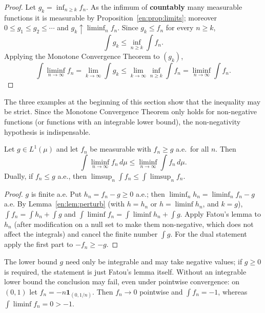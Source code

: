 \documentclass[11pt]{article}
\makeatletter
\newcommand{\envlabel}[1]{\protected@edef\@currentlabel{\themathenv}\label{#1}}
\makeatother
\begin{document}
\begin{proof}
Let $g_{k}=\inf_{n\geq k}f_{n}$. As the infimum of \textbf{countably} many measurable functions it is measurable by Proposition~\ref{en:prop:limits}; moreover $0\leq g_{1}\leq g_{2}\leq\cdots$ and $g_{k}\uparrow\liminf_{n}f_{n}$. Since $g_{k}\leq f_{n}$ for every $n\geq k$,
\[
\int g_{k}\leq\inf_{n\geq k}\int f_{n}.
\]
Applying the Monotone Convergence Theorem to $(g_{k})$,
\[
\int\liminf_{n\to\infty}f_{n}=\lim_{k\to\infty}\int g_{k}\leq\lim_{k\to\infty}\inf_{n\geq k}\int f_{n}=\liminf_{n\to\infty}\int f_{n}.
\]
\end{proof}

The three examples at the beginning of this section show that the inequality may be strict. Since the Monotone Convergence Theorem only holds for non-negative functions (or functions with an integrable lower bound), the non-negativity hypothesis is indispensable.

\begin{corollary}\envlabel{en:cor:fatougen}
Let $g\in L^{1}(\mu)$ and let $f_{n}$ be measurable with $f_{n}\geq g$ a.e.\ for all $n$. Then
\[
\int\liminf_{n\to\infty}f_{n}\,d\mu\leq\liminf_{n\to\infty}\int f_{n}\,d\mu.
\]
Dually, if $f_{n}\leq g$ a.e., then $\limsup_{n}\int f_{n}\leq\int\limsup_{n}f_{n}$.
\end{corollary}

\begin{proof}
$g$ is finite a.e. Put $h_{n}=f_{n}-g\geq0$ a.e.; then $\liminf_{n}h_{n}=\liminf_{n}f_{n}-g$ a.e. By Lemma~\ref{en:lem:perturb} (with $h=h_{n}$ or $h=\liminf h_{n}$, and $k=g$), $\int f_{n}=\int h_{n}+\int g$ and $\int\liminf f_{n}=\int\liminf h_{n}+\int g$. Apply Fatou's lemma to $h_{n}$ (after modification on a null set to make them non-negative, which does not affect the integrals) and cancel the finite number $\int g$. For the dual statement apply the first part to $-f_{n}\geq-g$.
\end{proof}

\begin{remark}
The lower bound $g$ need only be integrable and may take negative values; if $g\geq0$ is required, the statement is just Fatou's lemma itself. Without an integrable lower bound the conclusion may fail, even under pointwise convergence: on $(0,1)$ let $f_{n}=-n\mathbf{1}_{(0,1/n)}$. Then $f_{n}\to0$ pointwise and $\int f_{n}=-1$, whereas $\int\liminf f_{n}=0>-1$.
\end{remark}
\end{document}
